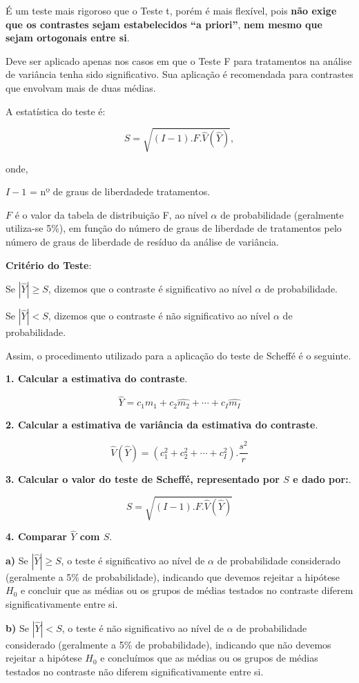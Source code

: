 \documentclass[
]{book}
\begin{document}
É um teste mais rigoroso que o Teste t, porém é mais flexível, pois \textbf{não exige que os contrastes sejam estabelecidos ``a priori''}, \textbf{nem mesmo que sejam ortogonais entre si}.

Deve ser aplicado apenas nos casos em que o Teste F para tratamentos na análise de variância tenha sido significativo. Sua aplicação é recomendada para contrastes que envolvam mais de duas médias.

A estatística do teste é:

\[
S = \sqrt{(I-1).F.\hat{V}(\hat{Y})},
\]

onde,

\(I-1\) = nº de graus de liberdadede tratamentos.

\(F\) é o valor da tabela de distribuição F, ao nível \(\alpha\) de probabilidade (geralmente utiliza-se 5\%), em função do número de graus de liberdade de tratamentos pelo número de graus de liberdade de resíduo da análise de variância.

\textbf{Critério do Teste}:

Se \(|\hat{Y}| \ge S\), dizemos que o contraste é significativo ao nível \(\alpha\) de probabilidade.

Se \(|\hat{Y}| < S\), dizemos que o contraste é não significativo ao nível \(\alpha\) de probabilidade.

Assim, o procedimento utilizado para a aplicação do teste de Scheffé é o seguinte.

\textbf{1. Calcular a estimativa do contraste}.

\[
\hat{Y} = c_1\hat{m_1} + c_2\hat{m_2} + \cdots + c_I\hat{m_I}
\]

\textbf{2. Calcular a estimativa de variância da estimativa do contraste}.

\[
\hat{V}(\hat{Y}) = (c_1^2+c_2^2 + \cdots + c_I^2).\frac{s^2}{r}
\]

\textbf{3. Calcular o valor do teste de Scheffé, representado por \(S\) e dado por:}.

\[
S=\sqrt{(I-1).F.\hat{V}(\hat{Y})}
\]

\textbf{4. Comparar \(\hat{Y}\) com \(S\)}.

\textbf{a)} Se \(|\hat{Y}| \ge S\), o teste é significativo ao nível de \(\alpha\) de probabilidade considerado (geralmente a 5\% de probabilidade), indicando que devemos rejeitar a hipótese \(H_0\) e concluir que as médias ou os grupos de médias testados no contraste diferem significativamente entre si.

\textbf{b)} Se \(|\hat{Y}| < S\), o teste é não significativo ao nível de \(\alpha\) de probabilidade considerado (geralmente a 5\% de probabilidade), indicando que não devemos rejeitar a hipótese \(H_0\) e concluímos que as médias ou os grupos de médias testados no contraste não diferem significativamente entre si.
\end{document}
